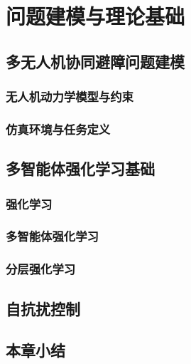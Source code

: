 \chapter{问题建模与理论基础}
\section{多无人机协同避障问题建模}
\subsection{无人机动力学模型与约束}
\subsection{仿真环境与任务定义}

\section{多智能体强化学习基础}
\subsection{强化学习}
\subsection{多智能体强化学习}
\subsection{分层强化学习}

\section{自抗扰控制}
\section{本章小结}
